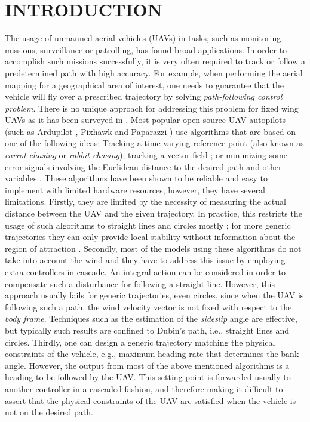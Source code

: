 \documentclass[letterpaper, 10 pt, conference]{ieeeconf}  %
\begin{document}
\section{INTRODUCTION}
The usage of unmanned aerial vehicles (UAVs) in tasks, such as monitoring missions, surveillance or patrolling, has found broad applications. In order to accomplish such missions successfully, it is very often required to track or follow a predetermined path with high accuracy. For example, when performing the aerial mapping for a geographical area of interest, one needs to guarantee that the vehicle will fly over a prescribed trajectory by solving \emph{path-following control problem}. There is no unique approach for addressing this problem for fixed wing UAVs as it has been surveyed in \cite{sujit}. Most popular open-source UAV autopilots (such as Ardupilot \cite{ardu}, Pixhawk \cite{pixhawk} and Paparazzi \cite{papa}) use algorithms that are based on one of the following ideas: Tracking a time-varying reference point \cite{micaelli1993trajectory,soetanto2003adaptive,park2004new} (also known as \emph{carrot-chasing} or \emph{rabbit-chasing}); tracking a vector field \cite{nelson2007vector,frew2007lyapunov}; or minimizing some error signals involving the Euclidean distance to the desired path and other variables \cite{ratnoo2011adaptive}. These algorithms have been shown to be reliable and easy to implement with limited hardware resources; however, they have several limitations. Firstly, they are limited by the necessity of measuring the actual distance between the UAV and the given trajectory. In practice, this restricts the usage of such algorithms to straight lines and circles mostly \cite{nelson2007vector,frew2007lyapunov,ratnoo2011adaptive}; for more generic trajectories they can only provide local stability without information about the region of attraction \cite{park2004new}. Secondly, most of the models using these algorithms do not take into account the wind and they have to address this issue by employing extra controllers in cascade. An integral action can be considered in order to compensate such a disturbance for following a straight line. However, this approach usually fails for generic trajectories, even circles, since when the UAV is following such a path, the wind velocity vector is not fixed with respect to the \emph{body frame}. Techniques such as the estimation of the \emph{sideslip} angle are effective, but typically such results \cite{fossen2015line} are confined to Dubin's path, i.e., straight lines and circles. Thirdly, one can design a generic trajectory matching the physical constraints of the vehicle, e.g., maximum heading rate that determines the bank angle. However, the output from most of the above mentioned algorithms is a heading to be followed by the UAV. This setting point is forwarded usually to another controller in a cascaded fashion, and therefore making it difficult to assert that the physical constraints of the UAV are satisfied when the vehicle is not on the desired path.
\end{document}
